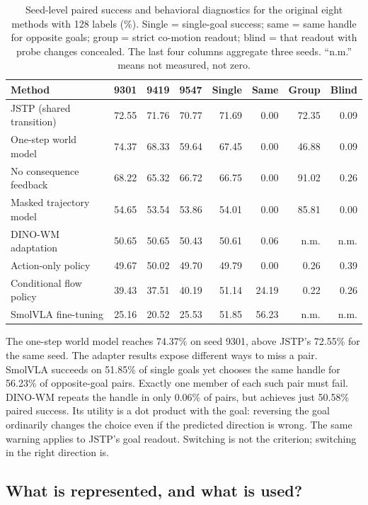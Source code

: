\documentclass[11pt]{article}
\begin{document}
\begin{table}[htbp]
\centering\small\setlength{\tabcolsep}{3.5pt}
\caption{Seed-level paired success and behavioral diagnostics for the original eight methods with 128 labels (\%). Single = single-goal success; same = same handle for opposite goals; group = strict co-motion readout; blind = that readout with probe changes concealed. The last four columns aggregate three seeds. ``n.m.'' means not measured, not zero.}
\label{tab:3}
\begin{tabularx}{\linewidth}{@{}>{\raggedright\arraybackslash}Xrrrrrrr@{}}
\toprule
\textbf{Method} & \textbf{9301} & \textbf{9419} & \textbf{9547} & \textbf{Single} & \textbf{Same} & \textbf{Group} & \textbf{Blind} \\
\midrule
JSTP (shared transition) & 72.55 & 71.76 & 70.77 & 71.69 & 0.00 & 72.35 & 0.09 \\
One-step world model & 74.37 & 68.33 & 59.64 & 67.45 & 0.00 & 46.88 & 0.09 \\
No consequence feedback & 68.22 & 65.32 & 66.72 & 66.75 & 0.00 & 91.02 & 0.26 \\
Masked trajectory model & 54.65 & 53.54 & 53.86 & 54.01 & 0.00 & 85.81 & 0.00 \\
DINO-WM adaptation & 50.65 & 50.65 & 50.43 & 50.61 & 0.06 & n.m. & n.m. \\
Action-only policy & 49.67 & 50.02 & 49.70 & 49.79 & 0.00 & 0.26 & 0.39 \\
Conditional flow policy & 39.43 & 37.51 & 40.19 & 51.14 & 24.19 & 0.22 & 0.26 \\
SmolVLA fine-tuning & 25.16 & 20.52 & 25.53 & 51.85 & 56.23 & n.m. & n.m. \\
\bottomrule
\end{tabularx}
\end{table}

The one-step world model reaches 74.37\% on seed 9301, above JSTP's 72.55\% for the same seed. The adapter results expose different ways to miss a pair. SmolVLA succeeds on 51.85\% of single goals yet chooses the same handle for 56.23\% of opposite-goal pairs. Exactly one member of each such pair must fail. DINO-WM repeats the handle in only 0.06\% of pairs, but achieves just 50.58\% paired success. Its utility is a dot product with the goal: reversing the goal ordinarily changes the choice even if the predicted direction is wrong. The same warning applies to JSTP's goal readout. Switching is not the criterion; switching in the right direction is.

\subsection{What is represented, and what is used?}
\end{document}
